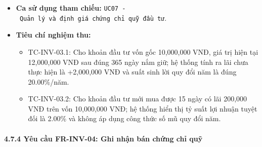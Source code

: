 \documentclass[11pt,a4paper]{article}
\providecommand{\tightlist}{
  \setlength{\itemsep}{0pt}\setlength{\parskip}{0pt}}
\begin{document}
\begin{itemize}
  \begin{itemize}
  \tightlist
  \item
    Bảng tổng hợp hiệu suất đầu tư gồm: Vốn gốc, Giá trị thị trường hiện
    tại, Lãi/lỗ chưa thực hiện, Tỷ suất lợi nhuận tuyệt đối (\%), Suất
    sinh lời quy đổi năm (\%/năm).
  \end{itemize}
\item
  \textbf{Ca sử dụng tham chiếu:}
  \texttt{UC07\ -\ Quản\ lý\ và\ định\ giá\ chứng\ chỉ\ quỹ\ đầu\ tư}.
\item
  \textbf{Tiêu chí nghiệm thu:}

  \begin{itemize}
  \tightlist
  \item
    TC-INV-03.1: Cho khoản đầu tư vốn gốc 10,000,000 VNĐ, giá trị hiện
    tại 12,000,000 VNĐ sau đúng 365 ngày nắm giữ; hệ thống tính ra lãi
    chưa thực hiện là +2,000,000 VNĐ và suất sinh lời quy đổi năm là
    đúng 20.00\%/năm.
  \item
    TC-INV-03.2: Cho khoản đầu tư mới mua được 15 ngày có lãi 200,000
    VNĐ trên vốn 10,000,000 VNĐ; hệ thống hiển thị tỷ suất lợi nhuận
    tuyệt đối là 2.00\% và không áp dụng công thức số mũ quy đổi năm.
  \end{itemize}
\end{itemize}

\paragraph{4.7.4 Yêu cầu FR-INV-04: Ghi nhận bán chứng chỉ
quỹ}\label{474-yuxeau-cux1ea7u-fr-inv-04-ghi-nhux1eadn-buxe1n-chux1ee9ng-chux1ec9-quux1ef9}
\end{document}
